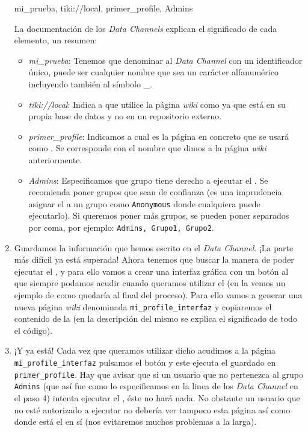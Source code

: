 \begin{enumerate}
\begin{pyglist}[language=text]
  mi_prueba, tiki://local, primer_profile, Admins
\end{pyglist}
 
La documentación de los \textit{Data Channels} explican el significado de cada elemento, un resumen:
\begin{itemize}
\item \textit{mi\_prueba}: Tenemos que denominar al \textit{Data Channel} con un identificador único, puede ser cualquier nombre que sea un carácter alfanumérico incluyendo también al símbolo \_.

\item \textit{tiki://local}: Indica a \tiki{} que utilice la página \textit{wiki} como \profile{} ya que está en su propia base de datos y no en un repositorio externo.

\item \textit{primer\_profile}: Indicamos a \tiki{} cual es la página en concreto que se usará como \profile{}. Se corresponde con el nombre que dimos a la página \textit{wiki} anteriormente.

\item \textit{Admins}: Especificamos que grupo tiene derecho a ejecutar el \profile{}. Se recomienda poner grupos que sean de confianza (es una imprudencia asignar el \profile{} a un grupo como \texttt{Anonymous} donde cualquiera puede ejecutarlo). Si queremos poner más grupos, se pueden poner separados por coma, por ejemplo: \texttt{Admins, Grupo1, Grupo2}.
\end{itemize}

\item Guardamos la información que hemos escrito en el \textit{Data Channel}. ¡La parte más difícil ya está superada! Ahora tenemos que buscar la manera de poder ejecutar el \profile{}, y para ello vamos a crear una interfaz gráfica con un botón al que siempre podamos acudir cuando queramos utilizar el \profile{} (en la  vemos un ejemplo de como quedaría al final del proceso). Para ello vamos a generar una nueva página \textit{wiki} denominada \texttt{mi\_profile\_interfaz} y copiaremos el contenido de la  (en la descripción del mismo se explica el significado de todo el código).

\item ¡Y ya está! Cada vez que queramos utilizar dicho \profile{} acudimos a la página \texttt{mi\_profile\_interfaz} pulsamos el botón y este ejecuta el \profile{} guardado en \texttt{primer\_profile}. Hay que avisar que si un usuario que no pertenezca al grupo \texttt{Admins} (que así fue como lo especificamos en la linea de los \textit{Data Channel} en el paso 4) intenta ejecutar el \profile{}, éste no hará nada. No obstante un usuario que no esté autorizado a ejecutar \profiles{} no debería ver tampoco esta página así como donde está el \profile{} en sí (nos evitaremos muchos problemas a la larga).
\end{enumerate}

